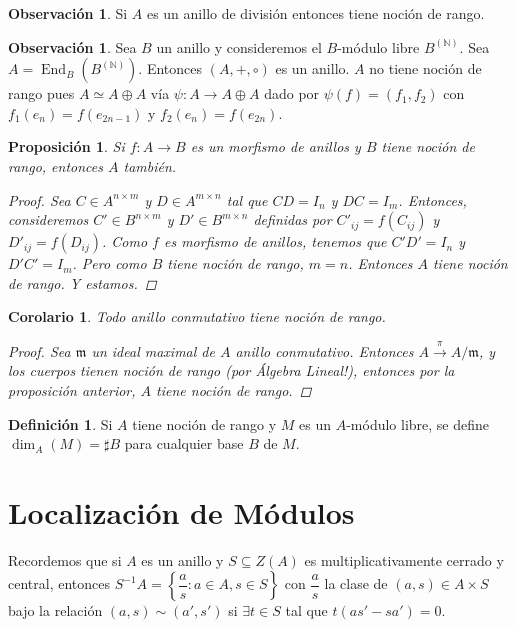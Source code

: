 \documentclass[12pt]{book}
\newtheorem{prop}[teo]{Proposición}
\newtheorem{cor}[teo]{Corolario}
\theoremstyle{definition}
\newtheorem{obs}[teo]{Observación}
\newtheorem{defn}[teo]{Definición}
\newcommand{\NN}{\mathbb{N}}
\DeclareMathOperator{\End}{End}
\begin{document}
\begin{obs}
Si $A$ es un anillo de división entonces tiene noción de rango.
\end{obs}

\begin{obs}
Sea $B$ un anillo y consideremos el $B$-módulo libre $B^{(\NN)}$. Sea $A=\End_B(B^{(\NN)})$. Entonces $(A,+,\circ)$ es un anillo. $A$ no tiene noción de rango pues $A\simeq A\oplus A$ vía $\psi :A\to A\oplus A$ dado por $\psi(f)=(f_1,f_2)$ con $f_1(e_n)=f(e_{2n-1})$ y $f_2(e_n)=f(e_{2n})$.
\end{obs}

\begin{prop}
Si $f:A\to B$ es un morfismo de anillos y $B$ tiene noción de rango, entonces $A$ también.
\begin{proof}
Sea $C\in A^{n\times m}$ y $D\in A^{m\times n}$ tal que $CD=I_n$ y $DC=I_m$. Entonces, consideremos $C'\in B^{n\times m}$ y $D'\in B^{m\times n}$ definidas por $C'_{ij} = f(C_{ij})$ y $D'_{ij}=f(D_{ij})$. Como $f$ es morfismo de anillos, tenemos que $C'D' = I_n$ y $D'C'=I_m$. Pero como $B$ tiene noción de rango, $m=n$. Entonces $A$ tiene noción de rango. Y estamos.
\end{proof}
\end{prop}
\begin{cor}
Todo anillo conmutativo tiene noción de rango.
\begin{proof}
Sea $\mathfrak{m}$ un ideal maximal de $A$ anillo conmutativo. Entonces $A\stackrel{\pi}{\longrightarrow} A/\mathfrak{m}$, y los cuerpos tienen noción de rango (por Álgebra Lineal!), entonces por la proposición anterior, $A$ tiene noción de rango.
\end{proof}
\end{cor}

\begin{defn}
Si $A$ tiene noción de rango y $M$ es un $A$-módulo libre, se define $\dim_A(M)=\sharp B$ para cualquier base $B$ de $M$.
\end{defn}

\section{Localización de Módulos}

Recordemos que si $A$ es un anillo y $S\subseteq Z(A)$ es multiplicativamente cerrado y central, entonces $S^{-1}A = \left\{\dfrac{a}{s}:a\in A, s\in S\right\}$ con $\dfrac{a}{s}$ la clase de $(a,s)\in A\times S$ bajo la relación $(a,s)\sim (a',s')$ si $\exists t\in S$ tal que $t(as'-sa')=0$.
\end{document}
